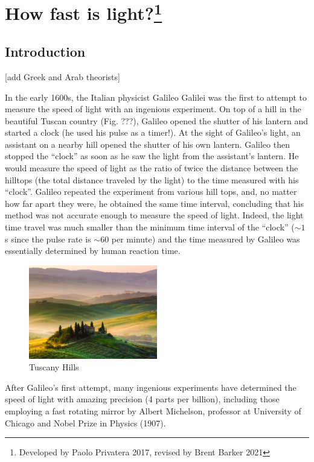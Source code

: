 \chapter[How fast is light?]{How fast is light?\footnote{Developed by Paolo Privatera 2017, revised by Brent Barker 2021}}

\section{Introduction}

[add Greek and Arab theorists]

In the early 1600s, the Italian physicist Galileo Galilei was the first to attempt to measure the speed of light with an ingenious experiment. On top of a hill in the beautiful Tuscan country (Fig. ???), Galileo opened the shutter of his lantern and started a clock (he used his pulse as a timer!).  At the sight of Galileo’s light, an assistant on a nearby hill opened the shutter of his own lantern. Galileo then stopped the “clock” as soon as he saw the light from the assistant’s lantern. He would measure the speed of light as the ratio of twice the distance between the hilltops (the total distance traveled by the light) to the time measured with his “clock”.  Galileo repeated the experiment from various hill tops, and, no matter how far apart they were, he obtained the same time interval, concluding that his method was not accurate enough to measure the speed of light. Indeed, the light time travel was much smaller than the minimum time interval of the  “clock” ($\sim 1\:$s since the pulse rate is $\sim 60$ per minute) and the time measured by Galileo was essentially determined by human reaction time.

\begin{figure}
	\centering
	\includegraphics[width=0.5\textwidth]{speed-of-light/tuscany.png}
	\caption{Tuscany Hills}\label{sol:fig:tuscany}
\end{figure}

After Galileo’s first attempt, many ingenious experiments have determined the speed of light with amazing precision (4 parts per billion), including those employing a fast rotating mirror by Albert Michelson, professor at University of Chicago and Nobel Prize in Physics (1907).   

